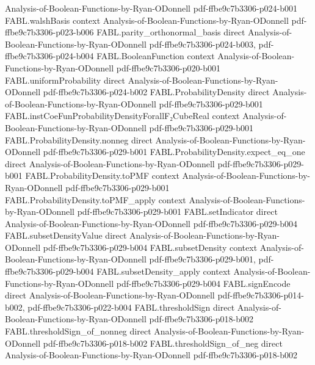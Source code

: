 \begin{theorem}
  {Analysis-of-Boolean-Functions-by-Ryan-ODonnell}
  {pdf-ffbe9c7b3306-p024-b001}
\proofstep
  {FABL.walshBasis}
  {context}
  {Analysis-of-Boolean-Functions-by-Ryan-ODonnell}
  {pdf-ffbe9c7b3306-p023-b006}
\proofstep
  {FABL.parity_orthonormal_basis}
  {direct}
  {Analysis-of-Boolean-Functions-by-Ryan-ODonnell}
  {pdf-ffbe9c7b3306-p024-b003,
    pdf-ffbe9c7b3306-p024-b004}
\proofstep
  {FABL.BooleanFunction}
  {context}
  {Analysis-of-Boolean-Functions-by-Ryan-ODonnell}
  {pdf-ffbe9c7b3306-p020-b001}
\proofstep
  {FABL.uniformProbability}
  {direct}
  {Analysis-of-Boolean-Functions-by-Ryan-ODonnell}
  {pdf-ffbe9c7b3306-p024-b002}
\proofstep
  {FABL.ProbabilityDensity}
  {direct}
  {Analysis-of-Boolean-Functions-by-Ryan-ODonnell}
  {pdf-ffbe9c7b3306-p029-b001}
\proofstep
  {FABL.instCoeFunProbabilityDensityForallF₂CubeReal}
  {context}
  {Analysis-of-Boolean-Functions-by-Ryan-ODonnell}
  {pdf-ffbe9c7b3306-p029-b001}
\proofstep
  {FABL.ProbabilityDensity.nonneg}
  {direct}
  {Analysis-of-Boolean-Functions-by-Ryan-ODonnell}
  {pdf-ffbe9c7b3306-p029-b001}
\proofstep
  {FABL.ProbabilityDensity.expect_eq_one}
  {direct}
  {Analysis-of-Boolean-Functions-by-Ryan-ODonnell}
  {pdf-ffbe9c7b3306-p029-b001}
\proofstep
  {FABL.ProbabilityDensity.toPMF}
  {context}
  {Analysis-of-Boolean-Functions-by-Ryan-ODonnell}
  {pdf-ffbe9c7b3306-p029-b001}
\proofstep
  {FABL.ProbabilityDensity.toPMF_apply}
  {context}
  {Analysis-of-Boolean-Functions-by-Ryan-ODonnell}
  {pdf-ffbe9c7b3306-p029-b001}
\proofstep
  {FABL.setIndicator}
  {direct}
  {Analysis-of-Boolean-Functions-by-Ryan-ODonnell}
  {pdf-ffbe9c7b3306-p029-b004}
\proofstep
  {FABL.subsetDensityValue}
  {direct}
  {Analysis-of-Boolean-Functions-by-Ryan-ODonnell}
  {pdf-ffbe9c7b3306-p029-b004}
\proofstep
  {FABL.subsetDensity}
  {context}
  {Analysis-of-Boolean-Functions-by-Ryan-ODonnell}
  {pdf-ffbe9c7b3306-p029-b001,
    pdf-ffbe9c7b3306-p029-b004}
\proofstep
  {FABL.subsetDensity_apply}
  {context}
  {Analysis-of-Boolean-Functions-by-Ryan-ODonnell}
  {pdf-ffbe9c7b3306-p029-b004}
\proofstep
  {FABL.signEncode}
  {direct}
  {Analysis-of-Boolean-Functions-by-Ryan-ODonnell}
  {pdf-ffbe9c7b3306-p014-b002,
    pdf-ffbe9c7b3306-p022-b004}
\proofstep
  {FABL.thresholdSign}
  {direct}
  {Analysis-of-Boolean-Functions-by-Ryan-ODonnell}
  {pdf-ffbe9c7b3306-p018-b002}
\proofstep
  {FABL.thresholdSign_of_nonneg}
  {direct}
  {Analysis-of-Boolean-Functions-by-Ryan-ODonnell}
  {pdf-ffbe9c7b3306-p018-b002}
\proofstep
  {FABL.thresholdSign_of_neg}
  {direct}
  {Analysis-of-Boolean-Functions-by-Ryan-ODonnell}
  {pdf-ffbe9c7b3306-p018-b002}

\end{theorem}

